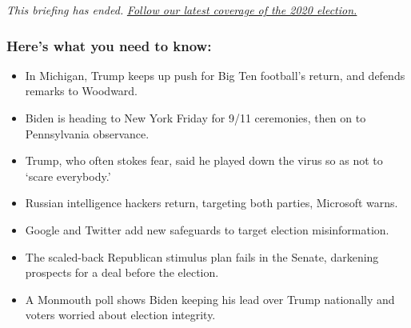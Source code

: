 \emph{This briefing has ended.}
\href{https://www.nytimes3xbfgragh.onion/live/2020/09/11/us/trump-vs-biden}{\emph{Follow
our latest coverage of the 2020 election.}}

\hypertarget{heres-what-you-need-to-know}{%
\subsubsection{Here's what you need to
know:}\label{heres-what-you-need-to-know}}

\begin{itemize}
\item
  \protect\hyperlink{in-michigan-trump-keeps-up-push-for-big-ten-footballs-return-and-defends-remarks-to-woodward}{}

  In Michigan, Trump keeps up push for Big Ten football's return, and
  defends remarks to Woodward.
\item
  \protect\hyperlink{biden-is-heading-to-new-york-friday-for-9-11-ceremonies-then-on-to-pennsylvania-observance}{}

  Biden is heading to New York Friday for 9/11 ceremonies, then on to
  Pennsylvania observance.
\item
  \protect\hyperlink{trump-who-often-stokes-fear-said-he-played-down-the-virus-so-as-not-to-scare-everybody}{}

  Trump, who often stokes fear, said he played down the virus so as not
  to `scare everybody.'
\item
  \protect\hyperlink{russian-intelligence-hackers-return-targeting-both-parties-microsoft-warns}{}

  Russian intelligence hackers return, targeting both parties, Microsoft
  warns.
\item
  \protect\hyperlink{google-and-twitter-add-new-safeguards-to-target-election-misinformation}{}

  Google and Twitter add new safeguards to target election
  misinformation.
\item
  \protect\hyperlink{the-scaled-back-republican-stimulus-plan-fails-in-the-senate-darkening-prospects-for-a-deal-before-the-election}{}

  The scaled-back Republican stimulus plan fails in the Senate,
  darkening prospects for a deal before the election.
\item
  \protect\hyperlink{a-monmouth-poll-shows-biden-keeping-his-lead-over-trump-nationally-and-voters-worried-about-election-integrity}{}

  A Monmouth poll shows Biden keeping his lead over Trump nationally and
  voters worried about election integrity.
\end{itemize}

